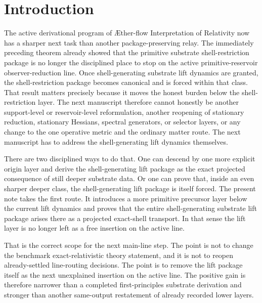\documentclass[11pt]{article}
\newcommand{\Aflow}{\AE{}ther-flow}
\newcommand{\TheoryName}{\Aflow{} Interpretation of Relativity}
\begin{document}
\section{Introduction}

The active derivational program of \TheoryName{} now has a sharper next task than another package-preserving relay. The immediately preceding theorem already showed that the primitive substrate shell-restriction package is no longer the disciplined place to stop on the active primitive-reservoir observer-reduction line. Once shell-generating substrate lift dynamics are granted, the shell-restriction package becomes canonical and is forced within that class. That result matters precisely because it moves the honest burden below the shell-restriction layer. The next manuscript therefore cannot honestly be another support-level or reservoir-level reformulation, another reopening of stationary reduction, stationary Hessians, spectral generators, or selector layers, or any change to the one operative metric and the ordinary matter route. The next manuscript has to address the shell-generating lift dynamics themselves.

There are two disciplined ways to do that. One can descend by one more explicit origin layer and derive the shell-generating lift package as the exact projected consequence of still deeper substrate data. Or one can prove that, inside an even sharper deeper class, the shell-generating lift package is itself forced. The present note takes the first route. It introduces a more primitive precursor layer below the current lift dynamics and proves that the entire shell-generating substrate lift package arises there as a projected exact-shell transport. In that sense the lift layer is no longer left as a free insertion on the active line.

That is the correct scope for the next main-line step. The point is not to change the benchmark exact-relativistic theory statement, and it is not to reopen already-settled line-routing decisions. The point is to remove the lift package itself as the next unexplained insertion on the active line. The positive gain is therefore narrower than a completed first-principles substrate derivation and stronger than another same-output restatement of already recorded lower layers.
\end{document}
